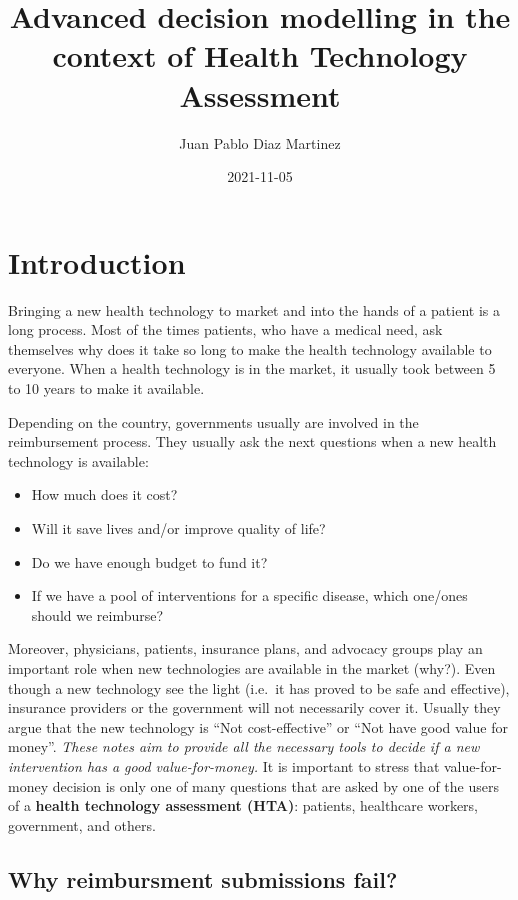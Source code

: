 \documentclass[
]{book}
\title{Advanced decision modelling in the context of Health Technology Assessment}
\author{Juan Pablo Diaz Martinez}
\date{2021-11-05}
\providecommand{\tightlist}{%
  \setlength{\itemsep}{0pt}\setlength{\parskip}{0pt}}
\begin{document}
\maketitle

{
\setcounter{tocdepth}{1}
\tableofcontents
}
\hypertarget{introduction}{%
\chapter*{Introduction}\label{introduction}}

Bringing a new health technology to market and into the hands of a patient is a long process. Most of the times patients, who have a medical need, ask themselves why does it take so long to make the health technology available to everyone. When a health technology is in the market, it usually took between 5 to 10 years to make
it available.

Depending on the country, governments usually are involved in the reimbursement process. They usually ask the next questions when a new health technology is available:

\begin{itemize}
\tightlist
\item
  How much does it cost?
\item
  Will it save lives and/or improve quality of life?
\item
  Do we have enough budget to fund it?
\item
  If we have a pool of interventions for a specific disease, which one/ones should we reimburse?
\end{itemize}

Moreover, physicians, patients, insurance plans, and advocacy groups play an important role when new technologies are available in the market (why?). Even though a new technology see the light (i.e.~it has proved to be safe and effective), insurance providers or the government will not necessarily cover it. Usually they argue that the new technology is ``Not cost-effective'' or ``Not have good value for money''. \emph{These notes aim to provide all the necessary tools to decide if a new intervention has a good value-for-money.} It is important to stress that value-for-money decision is only one of many questions that are asked by one of the users of a \textbf{health technology assessment (HTA)}: patients, healthcare workers, government, and others.

\hypertarget{why-reimbursment-submissions-fail}{%
\section*{Why reimbursment submissions fail?}\label{why-reimbursment-submissions-fail}}
\end{document}
